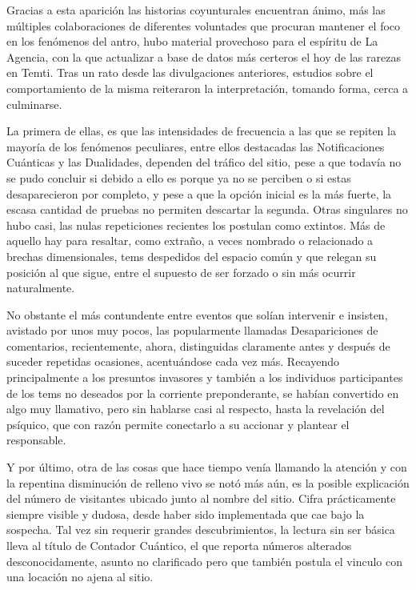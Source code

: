 \documentclass[
]{book}
\begin{document}
Gracias a esta aparición las historias coyunturales encuentran ánimo, más las múltiples colaboraciones de diferentes voluntades que procuran mantener el foco en los fenómenos del antro, hubo material provechoso para el espíritu de La Agencia, con la que actualizar a base de datos más certeros el hoy de las rarezas en Temti. Tras un rato desde las divulgaciones anteriores, estudios sobre el comportamiento de la misma reiteraron la interpretación, tomando forma, cerca a culminarse.

La primera de ellas, es que las intensidades de frecuencia a las que se repiten la mayoría de los fenómenos peculiares, entre ellos destacadas las Notificaciones Cuánticas y las Dualidades, dependen del tráfico del sitio, pese a que todavía no se pudo concluir si debido a ello es porque ya no se perciben o si estas desaparecieron por completo, y pese a que la opción inicial es la más fuerte, la escasa cantidad de pruebas no permiten descartar la segunda. Otras singulares no hubo casi, las nulas repeticiones recientes los postulan como extintos. Más de aquello hay para resaltar, como extraño, a veces nombrado o relacionado a brechas dimensionales, tems despedidos del espacio común y que relegan su posición al que sigue, entre el supuesto de ser forzado o sin más ocurrir naturalmente.

No obstante el más contundente entre eventos que solían intervenir e insisten, avistado por unos muy pocos, las popularmente llamadas Desapariciones de comentarios, recientemente, ahora, distinguidas claramente antes y después de suceder repetidas ocasiones, acentuándose cada vez más. Recayendo principalmente a los presuntos invasores y también a los individuos participantes de los tems no deseados por la corriente preponderante, se habían convertido en algo muy llamativo, pero sin hablarse casi al respecto, hasta la revelación del psíquico, que con razón permite conectarlo a su accionar y plantear el responsable.

Y por último, otra de las cosas que hace tiempo venía llamando la atención y con la repentina disminución de relleno vivo se notó más aún, es la posible explicación del número de visitantes ubicado junto al nombre del sitio. Cifra prácticamente siempre visible y dudosa, desde haber sido implementada que cae bajo la sospecha. Tal vez sin requerir grandes descubrimientos, la lectura sin ser básica lleva al título de Contador Cuántico, el que reporta números alterados desconocidamente, asunto no clarificado pero que también postula el vinculo con una locación no ajena al sitio.
\end{document}
